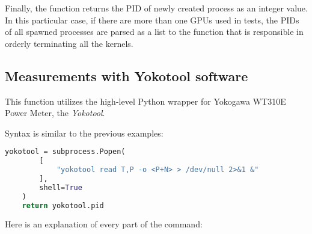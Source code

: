 Finally, the function returns the PID of newly created process
as an integer value. In this particular case, if there are more than one GPUs
used in tests, the PIDs of all spawned processes are parsed as a list to the
function that is responsible in orderly terminating all the kernels.

\newpage

\subsection{Measurements with Yokotool software}

This function utilizes the high-level Python wrapper for Yokogawa WT310E Power
Meter, the \emph{Yokotool}.

Syntax is similar to the previous examples:

\begin{lstlisting}[language=Python]
    yokotool = subprocess.Popen(
        [
            "yokotool read T,P -o <P+N> > /dev/null 2>&1 &"
        ],
        shell=True
    )
    return yokotool.pid
\end{lstlisting}

Here is an explanation of every part of the command:

